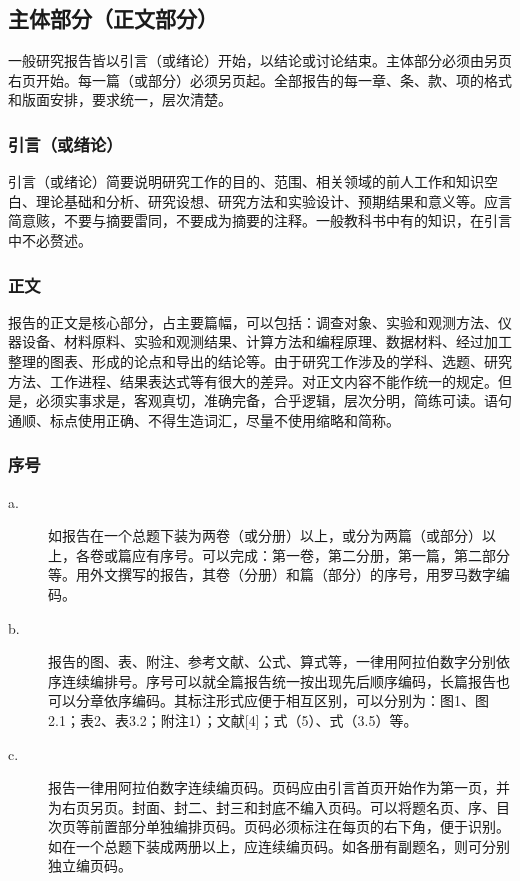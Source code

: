 \subsection{主体部分（正文部分）}

一般研究报告皆以引言（或绪论）开始，以结论或讨论结束。主体部分必须由另页右页开始。每一篇（或部分）必须另页起。全部报告的每一章、条、款、项的格式和版面安排，要求统一，层次清楚。


\subsubsection{引言（或绪论）}

引言（或绪论）简要说明研究工作的目的、范围、相关领域的前人工作和知识空白、理论基础和分析、研究设想、研究方法和实验设计、预期结果和意义等。应言简意赅，不要与摘要雷同，不要成为摘要的注释。一般教科书中有的知识，在引言中不必赘述。


\subsubsection{正文}

报告的正文是核心部分，占主要篇幅，可以包括：调查对象、实验和观测方法、仪器设备、材料原料、实验和观测结果、计算方法和编程原理、数据材料、经过加工整理的图表、形成的论点和导出的结论等。由于研究工作涉及的学科、选题、研究方法、工作进程、结果表达式等有很大的差异。对正文内容不能作统一的规定。但是，必须实事求是，客观真切，准确完备，合乎逻辑，层次分明，简练可读。语句通顺、标点使用正确、不得生造词汇，尽量不使用缩略和简称。


\subsubsection{序号}

\begin{description}

\item[a.] 如报告在一个总题下装为两卷（或分册）以上，或分为两篇（或部分）以上，各卷或篇应有序号。可以完成：第一卷，第二分册，第一篇，第二部分等。用外文撰写的报告，其卷（分册）和篇（部分）的序号，用罗马数字编码。

\item[b.] 报告的图、表、附注、参考文献、公式、算式等，一律用阿拉伯数字分别依序连续编排号。序号可以就全篇报告统一按出现先后顺序编码，长篇报告也可以分章依序编码。其标注形式应便于相互区别，可以分别为：图1、图2.1；表2、表3.2；附注1）；文献[4]；式（5）、式（3.5）等。

\item[c.] 报告一律用阿拉伯数字连续编页码。页码应由引言首页开始作为第一页，并为右页另页。封面、封二、封三和封底不编入页码。可以将题名页、序、目次页等前置部分单独编排页码。页码必须标注在每页的右下角，便于识别。如在一个总题下装成两册以上，应连续编页码。如各册有副题名，则可分别独立编页码。

\end{description}



